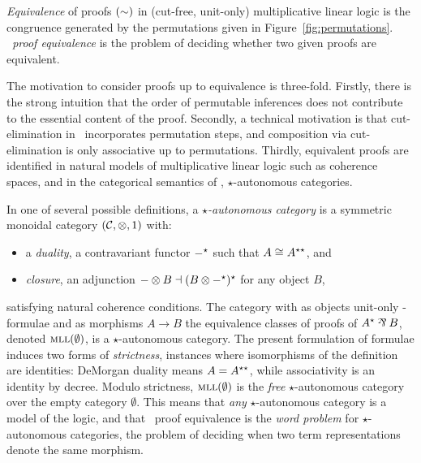 \begin{definition}
\label{def:equivalence}
%
\emph{Equivalence} of proofs $(\sim)$ in (cut-free, unit-only) multiplicative linear logic is the congruence generated by the permutations given in Figure~\ref{fig:permutations}.
%
\emph{\MLL\ proof equivalence} is the problem of deciding whether two given proofs are equivalent.
%
\end{definition}



The motivation to consider proofs up to equivalence is three-fold.
%
Firstly, there is the strong intuition that the order of permutable inferences does not contribute to the essential content of the proof.
%
Secondly, a technical motivation is that cut-elimination in \MLL\ incorporates permutation steps, and composition via cut-elimination is only associative up to permutations.
%
Thirdly, equivalent proofs are identified in natural models of multiplicative linear logic such as coherence spaces, and in the categorical semantics of \MLL, $\star$-autonomous categories.



In one of several possible definitions, a \emph{$\star$-autonomous category} \citep{Barr-1979} is a symmetric monoidal category $(\mathcal C,\otimes,1)$ with:
%
\begin{itemize}
	
	\item
	a \emph{duality}, a contravariant functor $\dual-$ such that $A\cong\dual*A$, and

	\item
	\emph{closure}, an adjunction $-\tn B \dashv \dual{(B\tn\dual-)}$ for any object $B$,

\end{itemize}
%
satisfying natural coherence conditions.
%
%
The category with as objects unit-only \MLL-formulae and as morphisms $A\to B$ the equivalence classes of proofs of $\dual A\parr B$, denoted $\textsc{mll}(\emptyset)$, is a $\star$-autonomous category.
%
The present formulation of formulae induces two forms of \emph{strictness}, instances where isomorphisms of the definition are identities: DeMorgan duality means $A=\dual*A$, while
associativity is an identity by decree.
%
Modulo strictness, $\textsc{mll}(\emptyset)$ is the \emph{free} $\star$-autonomous category over the empty category $\emptyset$.
%
This means that \emph{any} $\star$-autonomous category is a model of the logic, and that \MLL\ proof equivalence is the \emph{word problem} for $\star$-autonomous categories, the problem of deciding when two term representations denote the same morphism.




